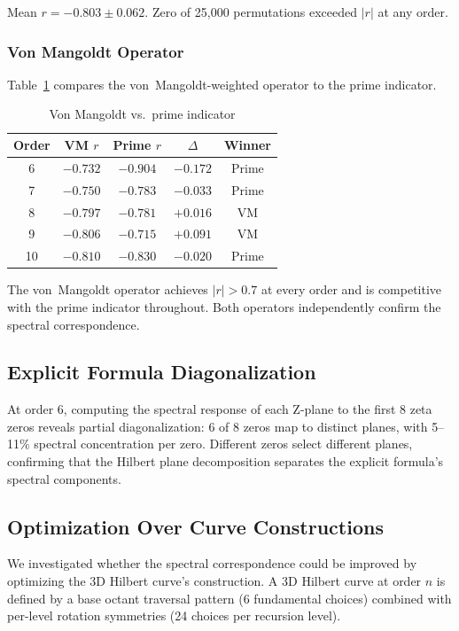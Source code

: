 \documentclass[11pt,a4paper]{article}
\begin{document}
Mean $r = -0.803 \pm 0.062$.  Zero of 25,000 permutations exceeded
$|r|$ at any order.

\subsubsection{Von Mangoldt Operator}

Table~\ref{tab:ev_vm} compares the von~Mangoldt-weighted operator to
the prime indicator.

\begin{table}[h]
\centering
\caption{Von Mangoldt vs.\ prime indicator}
\label{tab:ev_vm}
\begin{tabular}{ccccc}
\toprule
Order & VM $r$ & Prime $r$ & $\Delta$ & Winner \\
\midrule
6  & $-0.732$ & $-0.904$ & $-0.172$ & Prime \\
7  & $-0.750$ & $-0.783$ & $-0.033$ & Prime \\
8  & $-0.797$ & $-0.781$ & $+0.016$ & VM \\
9  & $-0.806$ & $-0.715$ & $+0.091$ & VM \\
10 & $-0.810$ & $-0.830$ & $-0.020$ & Prime \\
\bottomrule
\end{tabular}
\end{table}

The von~Mangoldt operator achieves $|r| > 0.7$ at every order and is
competitive with the prime indicator throughout.  Both operators
independently confirm the spectral correspondence.

\subsection{Explicit Formula Diagonalization}

At order 6, computing the spectral response of each Z-plane to the
first 8 zeta zeros reveals partial diagonalization: 6 of 8 zeros map
to distinct planes, with 5--11\% spectral concentration per zero.
Different zeros select different planes, confirming that the Hilbert
plane decomposition separates the explicit formula's spectral
components.


\subsection{Optimization Over Curve Constructions}

We investigated whether the spectral correspondence could be improved by
optimizing the 3D Hilbert curve's construction.  A 3D Hilbert curve at
order $n$ is defined by a base octant traversal pattern (6 fundamental
choices) combined with per-level rotation symmetries (24 choices per
recursion level).
\end{document}
